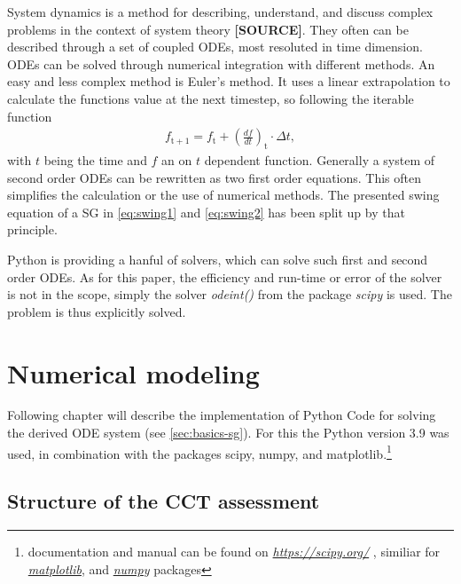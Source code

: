 System dynamics is a method for describing, understand, and discuss complex problems in the context of system theory \textbf{[SOURCE]}. They often can be described through a set of coupled \acfp{ODE}, most resoluted in time dimension. \acsp{ODE} can be solved through numerical integration with different methods. An easy and less complex method is Euler's method. It uses a linear extrapolation to calculate the functions value at the next timestep, so following the iterable function
\begin{align}
        f_\mathrm{t+1}=f_\mathrm{t}+\left(\frac{df}{dt}\right)_\mathrm{t} \cdot \Delta t \label{eq:euler},
\end{align}
with $t$ being the time and $f$ an on $t$ dependent function. Generally a system of second order \acsp{ODE} can be rewritten as two first order equations. This often simplifies the calculation or the use of numerical methods. The presented swing equation of a \acs{SG} in \autoref{eq:swing1} and \autoref{eq:swing2} has been split up by that principle.

Python is providing a hanful of solvers, which can solve such first and second order \acsp{ODE}. As for this paper, the efficiency and run-time or error of the solver is not in the scope, simply the solver {\itshape odeint()} from the package {\itshape scipy} is used. The problem is thus explicitly solved. 

\chapter{Numerical modeling}
\label{chap:methods}

Following chapter will describe the implementation of Python Code for solving the derived \acs{ODE} system (see \autoref{sec:basics-sg}). For this the Python version 3.9 was used, in combination with the packages scipy, numpy, and matplotlib.\footnote{documentation and manual can be found on \href{https://scipy.org/}{\itshape https://scipy.org/} \autocite{virtanenSciPyFundamentalAlgorithms2020}, similiar for \href{https://matplotlib.org/}{\itshape matplotlib}, and \href{https://numpy.org/}{\itshape numpy} packages} %

\section{Structure of the \acs{CCT} assessment}

